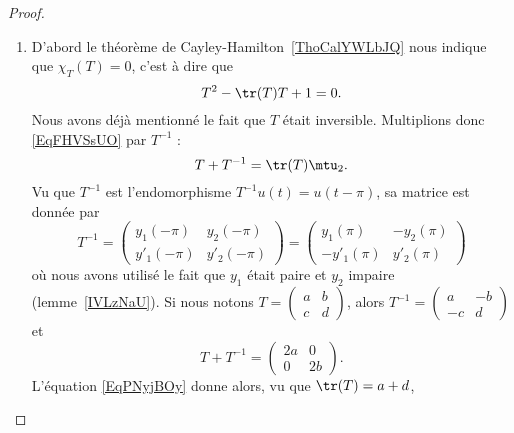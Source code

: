 \begin{proof}
\begin{enumerate}
        \item

            D'abord le théorème de Cayley-Hamilton~\ref{ThoCalYWLbJQ} nous indique que \( \chi_T(T)=0\), c'est à dire que
            \begin{equation}    \label{EqFHVSsUO}
                T^2-\tr(T)T+1=0.
            \end{equation}
            Nous avons déjà mentionné le fait que \( T\) était inversible. Multiplions donc \eqref{EqFHVSsUO} par \( T^{-1}\) :
            \begin{equation}    \label{EqPNyjBOy}
                T+T^{-1}=\tr(T)\mtu_2.
            \end{equation}
            Vu que \( T^{-1}\) est l'endomorphisme \( T^{-1}u(t)=u(t-\pi)\), sa matrice est donnée par
            \begin{equation}
                T^{-1}=\begin{pmatrix}
                    y_1(-\pi)    &   y_2(-\pi)    \\
                    y'_1(-\pi)    &   y'_2(-\pi)
                \end{pmatrix}=\begin{pmatrix}
                    y_1(\pi)    &   -y_2(\pi)    \\
                    -y'_1(\pi)    &   y'_2(\pi)
                \end{pmatrix}
            \end{equation}
            où nous avons utilisé le fait que \( y_1\) était paire et \( y_2\) impaire (lemme~\ref{IVLzNaU}). Si nous notons \( T=\begin{pmatrix}
                a    &   b    \\
                c    &   d
            \end{pmatrix}\), alors \( T^{-1}=\begin{pmatrix}
                a    &   -b    \\
                -c    &   d
            \end{pmatrix}\) et
            \begin{equation}
                T+T^{-1}=\begin{pmatrix}
                    2a    &     0  \\
                       0 &   2b
                \end{pmatrix}.
            \end{equation}
            L'équation \eqref{EqPNyjBOy} donne alors, vu que \( \tr(T)=a+d\),

\end{enumerate}
\end{proof}
